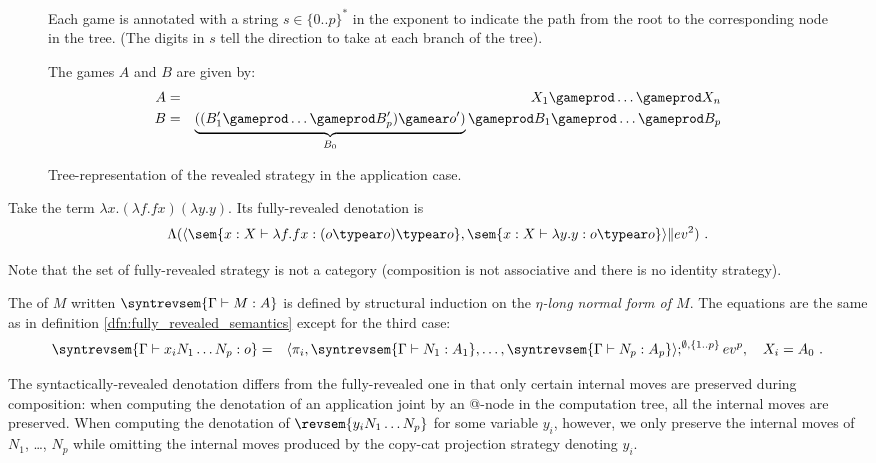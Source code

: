 \begin{figure}[htbp]
{     Each game is annotated with a string $s \in \{ 0..p \}^*$ in the exponent to indicate the path from the root to the corresponding node in the tree. (The digits in $s$ tell the direction to take at each branch of the tree).

    The games $A$ and $B$ are given by:
    \begin{eqnarray*}
        A &=& X_1 \gameprod \ldots \gameprod X_n\\
        B &=& \underbrace{((B_1' \gameprod \ldots \gameprod B_p') \gamear o')}_{B_0} \gameprod B_1 \gameprod \ldots \gameprod B_p
    \end{eqnarray*}
   }
       \caption{Tree-representation of the revealed strategy in the application case.}
      \label{fig:interaction_strategy_denotations}
    \end{figure}

\begin{example}
Take the term $\lambda x . (\lambda f . f x) (\lambda y . y)$.
Its fully-revealed denotation is $$\Lambda ( \langle \sem{ x:X \vdash \lambda f . f
x : (o\typear o) \typear o} , \sem{ x:X \vdash \lambda y . y
: o \typear o} \rangle \| ev^2 ) \ .$$
\end{example}

Note that the set of fully-revealed strategy is not a category (composition is not associative and there is no identity  strategy).


\begin{definition}
\label{dfn:syntactic_revealed_semantics} The  of $M$ written $\syntrevsem{\Gamma \vdash M : A}$ is defined by structural induction on the \emph{$\eta$-long normal form of $M$}. The equations are the same as in definition \ref{dfn:fully_revealed_semantics} except for the third case:
\begin{eqnarray*}
\syntrevsem{\Gamma  \vdash x_i N_1 \ldots N_p :o} &=& \langle \pi_i, \syntrevsem{\Gamma \vdash N_1 : A_1}, \ldots, \syntrevsem{\Gamma \vdash N_p : A_p}  \rangle ; ^{\emptyset,\{1..p\}} ev^p, \quad X_i = A_0 \ .
\end{eqnarray*}
\end{definition}

The syntactically-revealed denotation differs from the fully-revealed one in that only certain internal moves are preserved during composition: when computing the denotation of an application joint by an @-node in the computation tree, all the internal moves are preserved.
When computing the denotation of
$\revsem{y_i N_1 \ldots N_p}$ for some variable $y_i$, however, we only preserve the internal moves of
$N_1$, \ldots, $N_p$ while omitting the internal moves produced by the copy-cat projection strategy denoting $y_i$.



